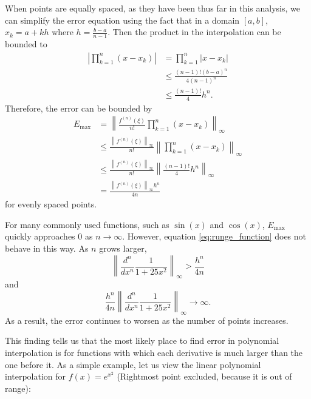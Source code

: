\documentclass{article}
\begin{document}
When points are equally spaced, as they have been thus far in this analysis, we can simplify the error equation using the fact that in a domain $[a, b]$, $x_k=a+kh$ where $h=\frac{b-a}{n-1}$. Then the product in the interpolation can be bounded to
\begin{align*}
    \left|\prod_{k=1}^n(x-x_k)\right| & = \prod_{k=1}^n|x-x_k|              \\
                                      & \leq \frac{(n-1)!(b-a)^n}{4(n-1)^n} \\ %
                                      & \leq \frac{(n-1)!}{4}h^n.
\end{align*}
Therefore, the error can be bounded by
\begin{align*}
    E_{\max} & = \left\lVert\frac{f^{(n)}(\xi)}{n!}\prod_{k=1}^n(x-x_k)\right\rVert_\infty                                       \\
             & \leq \frac{\left\lVert f^{(n)}(\xi)\right\rVert_{\infty}}{n!}\left\lVert\prod_{k=1}^n(x-x_k)\right\rVert_{\infty} \\
             & \leq \frac{\left\lVert f^{(n)}(\xi)\right\rVert_{\infty}}{n!}\left\lVert\frac{(n-1)!}{4}h^n\right\rVert_{\infty}  \\
             & = \frac{\left\lVert f^{(n)}(\xi)\right\rVert_{\infty}h^n}{4n}
\end{align*}
for evenly spaced points.

For many commonly used functions, such as $\sin(x)$ and $\cos(x)$, $E_{\max}$ quickly approaches 0 as $n\to\infty$. However, equation \eqref{eq:runge_function} does not behave in this way. As $n$ grows larger,
\[
    \left\lVert\frac{d^n}{dx^n}\frac{1}{1+25x^2}\right\rVert_\infty > \frac{h^n}{4n}
\]
and
\[
    \frac{h^n}{4n}\left\lVert\frac{d^n}{dx^n}\frac{1}{1+25x^2}\right\rVert_\infty\to\infty.
\]
As a result, the error continues to worsen as the number of points increases.

This finding tells us that the most likely place to find error in polynomial interpolation is for functions with which each derivative is much larger than the one before it. As a simple example, let us view the linear polynomial interpolation for $f(x)=e^{x^2}$ (Rightmost point excluded, because it is out of range):
\end{document}
